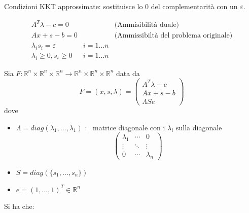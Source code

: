 Condizioni KKT approssimate:  sostituisce lo 0 del complementarit\`a con 
un $\varepsilon$.
\begin{center}
\fbox
{
 \begin{minipage}[position]{0.75\textwidth}
$$
\begin{array}{lll}
A^{T}\lambda  -c = 0 & & \text{(Ammisibilit\`a duale)}  \\
 Ax +s - b = 0 & &  \text{(Ammissibilt\`a del problema originale)} \\
 \lambda_i  s_i = \varepsilon & i=1\ldots n & \\
 \lambda_i \geq 0, s_i \geq 0 & i=1\ldots n  &
\end{array}
$$
\end{minipage}
}
\end{center}

Sia $F: \mathbb{R}^{n} \times \mathbb{R}^{n} \times \mathbb{R}^{n}
   \rightarrow
   \mathbb{R}^{n} \times \mathbb{R}^{n} \times \mathbb{R}^{n}$ data da
$$
F=(x, s , \lambda) =
\begin{pmatrix}
  A^{T} \lambda - c \\
  Ax  + s - b  \\
 \Lambda S e
\end{pmatrix}
$$
dove
\begin{itemize}
\item $\Lambda  = diag(\lambda_1,  \ldots , \lambda_1)$ : \ matrice diagonale con i $\lambda_i$ sulla diagonale
$$
\begin{pmatrix}
  \lambda_1 & \cdots & 0 \\
   \vdots & \ddots & \vdots \\
   0 &  \cdots & \lambda_n
\end{pmatrix}
$$
\item $S = diag(\{s_1, \ldots,  s_n \} )$
\item $e = (1, \ldots, 1)^{T} \in \mathbb{R}^{n}$
\end{itemize}
Si ha che:

